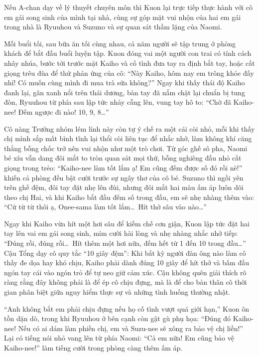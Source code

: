 \documentclass[../main.tex]{subfiles}
\begin{document}
\ct


Nếu A-chan dạy về lý thuyết chuyên môn thì Kuon lại trực tiếp thực hành với cô em gái song sinh của mình tại nhà, cùng sự góp mặt vui nhộn của hai em gái trong nhà là Ryuuhou và Suzuno và sự quan sát thầm lặng của Naomi.

Mỗi buổi tối, sau bữa ăn tối cùng nhau, cả năm người sẽ tập trung ở phòng khách để bắt đầu buổi luyện tập. Kuon đóng vai một người con trai có tính cách nhây nhúa, bước tới trước mặt Kaiho và cố tình đưa tay ra định bắt tay, hoặc cất giọng trêu đùa để thử phản ứng của cô: ``Này Kaiho, hôm nay em trông khỏe đấy nhỉ! Có muốn cùng mình đi mua trà sữa không?'' Ngay khi thấy thái độ Kaiho đanh lại, gân xanh nổi trên thái dương, bàn tay đã nắm chặt lại chuẩn bị tung đòn, Ryuuhou từ phía sau lập tức nhảy cẫng lên, vung tay hô to: ``Chờ đã Kaiho-nee! Đếm ngược đi nào! 10, 9, 8\dots''

Cô nàng Trưởng nhóm lém lỉnh này còn tự ý chế ra một cái còi nhỏ, mỗi khi thấy chị mình sắp mất bình tĩnh lại thổi còi liên tục để nhắc nhở, làm không khí căng thẳng bỗng chốc trở nên vui nhộn như một trò chơi. Từ góc ghế sô pha, Naomi bé xíu vẫn dang đôi mắt to tròn quan sát mọi thứ, bỗng nghiêng đầu nhỏ cất giọng trong trẻo: ``Kaiho-nee làm tốt lắm ạ! Em cũng đếm được số đó rồi nè!'' khiến cả phòng đều bật cười trước sự ngây thơ của cô bé. Suzuno thì ngồi yên trên ghế đệm, đôi tay đặt nhẹ lên đùi, nhưng đôi mắt hai màu ấm áp luôn dõi theo chị Hai, và khi Kaiho bắt đầu đếm số trong đầu, em sẽ nhẹ nhàng thêm vào: ``Cứ từ từ thôi ạ, Onee-sama làm tốt lắm\dots\ Hít thở sâu vào nào\dots''

Ngay khi Kaiho vừa hít một hơi sâu để kiềm chế cơn giận, Kuon lập tức đặt hai tay lên vai em gái song sinh, mỉm cười hài lòng và nhẹ nhàng nhắc nhở tiếp: ``Đúng rồi, đúng rồi\dots\ Hít thêm một hơi nữa, đếm hết từ 1 đến 10 trong đầu\dots'' Cậu Tổng dạy cô quy tắc ``10 giây đệm'': Khi bất kỳ người đàn ông nào làm cô thấy đe dọa hay khó chịu, Kaiho phải dành đúng 10 giây để hít thở và bấm đầu ngón tay cái vào ngón trỏ để tự neo giữ cảm xúc. Cậu không quên giải thích rõ ràng rằng đây không phải là để ép cô chịu đựng, mà là để cho bản thân cô thời gian phân biệt giữa nguy hiểm thực sự và những tình huống thường nhật.

``Anh không bắt em phải chịu đựng nếu họ cố tình vượt quá giới hạn,'' Kuon ôn tồn dặn dò, trong khi Ryuuhou ở bên cạnh còn gật gù phụ họa: ``Đúng đó Kaiho-nee! Nếu có ai dám làm phiền chị, em và Suzu-nee sẽ xông ra bảo vệ chị liền!'' Lại có tiếng nói nhỏ vang lên từ phía Naomi: ``Cả em nữa! Em cũng bảo vệ Kaiho-nee!'' làm tiếng cười trong phòng càng thêm ấm áp.
\end{document}

